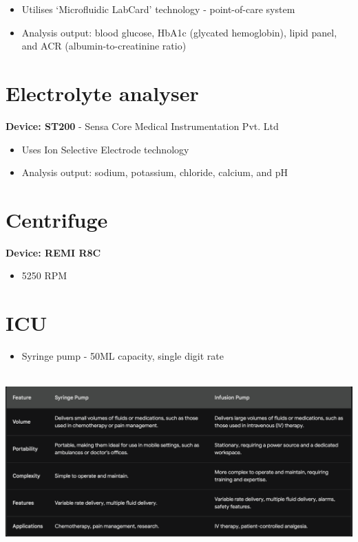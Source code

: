 \documentclass[
  11pt,
  letterpaper,
  DIV=11,
  numbers=noendperiod]{scrreprt}
\providecommand{\tightlist}{%
  \setlength{\itemsep}{0pt}\setlength{\parskip}{0pt}}\usepackage{longtable,booktabs,array}
\begin{document}
\begin{itemize}
\tightlist
\item
  Utilises `Microfluidic LabCard' technology - point-of-care system
\item
  Analysis output: blood glucose, HbA1c (glycated hemoglobin), lipid
  panel, and ACR (albumin-to-creatinine ratio)
\end{itemize}

\section{Electrolyte analyser}\label{electrolyte-analyser}

\textbf{Device: ST200} - Sensa Core Medical Instrumentation Pvt. Ltd

\begin{itemize}
\tightlist
\item
  Uses Ion Selective Electrode technology
\item
  Analysis output: sodium, potassium, chloride, calcium, and pH
\end{itemize}

\section{Centrifuge}\label{centrifuge}

\textbf{Device: REMI R8C}

\begin{itemize}
\tightlist
\item
  5250 RPM
\end{itemize}

\section{ICU}\label{icu}

\begin{itemize}
\tightlist
\item
  Syringe pump - 50ML capacity, single digit rate
\end{itemize}

\includegraphics[width=5.90625in,height=2.6875in]{Beyond the Sterile Walls e0cff5645ec24545a8c247940fff8e84/Untitled 10.png}
\end{document}
